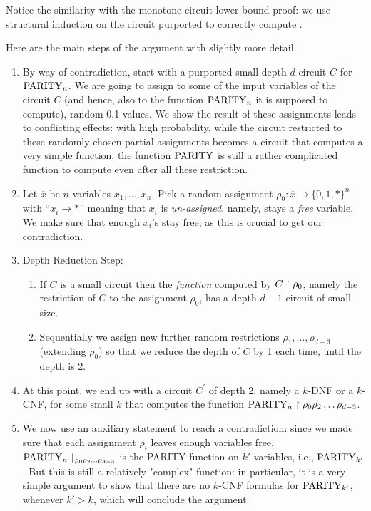 \begin{note} Notice the similarity with the monotone circuit lower bound proof: we use structural induction on the circuit purported to correctly compute \Parity. \end{note}

\medskip
Here are the main steps of the argument with slightly more detail.


\begin{enumerate}
\item By  way of contradiction, start with a purported small depth-$d$ circuit $C$ for $\operatorname{PARITY}_n$.
We are going to assign to some of the input variables of the circuit $C$ (and hence, also to the function $\operatorname{PARITY}_n$ it is supposed to compute), random 0,1 values. We show the result of these assignments leads to conflicting effects: with high probability, while the circuit restricted to these randomly chosen partial assignments becomes a circuit that computes a very simple function, the function $\operatorname{PARITY}$ is still a rather complicated function to compute even after all these restriction.
\item Let $\overline x$ be $n$ variables $x_1,\dots,x_n$. Pick a random assignment $\rho_0: \overline x \rightarrow\{0,1, *\}^n$ with ``$x_i \rightarrow *$'' meaning that $x_i$ is \emph{un-assigned}, namely, stays a \emph{free} variable. We make sure that enough $x_i$'s stay  free, as this is crucial to get our contradiction.
\label{it:two-165}

\item Depth Reduction Step: 

\begin{enumerate}
\item 
If $C$ is a small circuit then the \emph{function} computed by $C\upharpoonright\rho_0$, namely the restriction of $C$ to the assignment $\rho_0$, has a depth  $d-1$ circuit of small size. 

\item
Sequentially we assign new further random restrictions $\rho_1,\dots,\rho_{d-3}$
 (extending $\rho_0$) so that we reduce the depth of $C$ by 1 each time, until the depth is 2.
\end{enumerate}

\item 
At this point, we end up with a circuit $C^{\prime}$ of depth 2, namely a $k$-DNF or a $k$-CNF, for some small $k$ that computes the function 
$\operatorname{PARITY}_n\upharpoonright\rho_0\rho_2\ldots\rho_{d-3}$.

\item
We now use an auxiliary statement to reach a contradiction: since we made sure that each assignment $\rho_i$ leaves enough variables free, 
$\operatorname{PARITY}_n\upharpoonright_{\rho_0\rho_2\ldots\rho_{d-3}}$ is the PARITY function on $k'$ variables, i.e., $\operatorname{PARITY}_{k'}$. But this is still a relatively "complex" function:
in particular, it is a very simple argument to show that there are no $k$-CNF formulas for $\operatorname{PARITY}_{k'}$, whenever $k'>k$, which will conclude the argument.
\label{it:final-step:269}
\end{enumerate}
